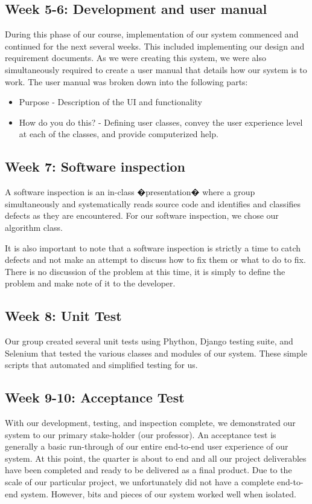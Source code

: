 \documentclass[12pt]{article}
\begin{document}
\subsection*{Week 5-6: Development and user manual}
During this phase of our course, implementation of our system commenced and continued for the next several weeks. This included implementing our design and requirement documents. As we were creating this system, we were also simultaneously required to create a user manual that details how our system is to work. The user manual was broken down into the following parts:
\begin{itemize}
\item Purpose - Description of the UI and functionality 
\item How do you do this? - Defining user classes, convey the user experience level at each of the classes,  and provide computerized help.
\end{itemize}

\subsection*{Week 7: Software inspection}

A software inspection is an in-class �presentation� where a group simultaneously and systematically reads source code and identifies and classifies defects as they are encountered. For our software inspection, we chose our algorithm class.

It is also important to note that a software inspection is strictly a time to catch defects and not make an attempt to discuss how to fix them or what to do to fix. There is no discussion of the problem at this time, it is simply to define the problem and make note of it to the developer. 

\subsection*{Week 8: Unit Test}

Our group created several unit tests using Phython, Django testing suite, and Selenium that tested the various classes and modules of our system. These simple scripts that automated and simplified testing for us.  
\subsection*{Week 9-10: Acceptance Test}

With our development, testing, and inspection complete, we demonstrated our system to our primary stake-holder (our professor). An acceptance test is generally a basic run-through of our entire end-to-end user experience of our system. 
At this point, the quarter is about to end and all our project deliverables have been completed and ready to be delivered as a final product. Due to the scale of our particular project, we unfortunately did not have a complete end-to-end system. However, bits and pieces of our system worked well when isolated. 
\end{document}
